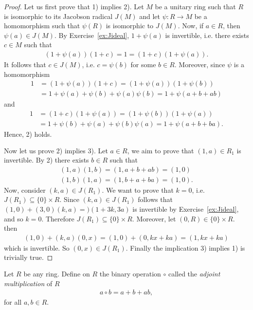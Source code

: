     \begin{proof}
        Let us first prove that 1) implies 2). 
        Let $M$ be a unitary ring such that $R$ is isomorphic to its Jacobson radical $J(M)$ and let $\psi: R \to M$ be a homomorphism such that $\psi(R)$ is isomorphic to $J(M)$. 
        Now, if $a\in R$, then $\psi(a)\in J(M)$. By Exercise~\ref{ex:Jideal}, $1+\psi(a)$ is invertible, i.e. there exists $c\in M$ such that 
        \begin{align*}
            (1+\psi(a))(1+c) = 1 = (1+c) (1+\psi(a)).
        \end{align*}
        It follows that $c\in J(M)$, i.e. $c=\psi(b)$ for some $b\in R$. Moreover, since $\psi$ is a homomorphism
        \begin{align*}
            1 &= (1+\psi(a))(1+c) = (1+\psi(a))(1+\psi(b)) \\&= 1 + \psi(a)+\psi(b)+\psi(a)\psi(b)
            = 1 + \psi(a+b +ab)
        \end{align*}
        and 
        \begin{align*}
            1 &= (1+c)(1+\psi(a)) = (1+\psi(b))(1+\psi(a)) \\&= 1 + \psi(b)+\psi(a)+\psi(b)\psi(a)
            = 1 + \psi(a+b+ba).
        \end{align*}
        Hence, 2) holds. 

        Now let us prove 2) implies 3). Let $a\in R$, we aim to prove that $(1,a)\in R_1$ is invertible. By 2) there exists $b\in R$ such that 
        \begin{align*}
            (1,a)(1,b) = (1, a+b+ab) = (1,0)\\
            (1,b)(1,a) = (1, b+a+ba) = (1,0).   
        \end{align*}
        Now, consider $(k,a)\in J(R_1)$. We want to prove that $k=0$, i.e. $J(R_1)\subseteq \{0\}\times R$. Since $(k,a)\in J(R_1)$ follows that $(1,0)+(3,0)(k,a)=)(1+3k,3a)$ is invertible by Exercise~\ref{ex:Jideal}, and so $k=0$. Therefore $J(R_1)\subseteq \{0\}\times R$. Moreover, let $(0,R)\in\{0\}\times R$. then 
        \begin{align*}
            (1,0) + (k,a) (0,x) = (1,0)+(0,kx+ka) = (1, kx+ka)
        \end{align*}
        which is invertible. So $(0,x)\in J(R_1)$.
        Finally the implication 3) implies 1) is trivially true.
    \end{proof}

    \begin{definition}
         Let $R$ be any ring. Define on $R$ the binary operation $\circ$ called the \emph{adjoint multiplication} of $R$
        \begin{align*}
            a\circ b = a+b+ab,
        \end{align*}
        for all $a,b\in R$. 
    \end{definition}

